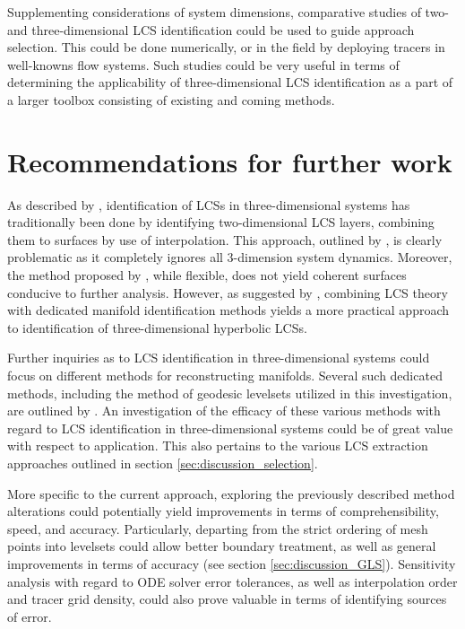 Supplementing considerations of system dimensions, comparative studies of two- and three-dimensional LCS identification could be used to guide approach selection. This could be done numerically, or in the field by deploying tracers in well-knowns flow systems. Such studies could be very useful in terms of determining the applicability of three-dimensional LCS identification as a part of a larger toolbox consisting of existing and coming methods.


\section{Recommendations for further work}

As described by \cite{Oettinger}, identification of LCSs in three-dimensional systems has traditionally been done by identifying two-dimensional LCS layers, combining them to surfaces by use of interpolation. This approach, outlined by \cite{Blazevski}, is clearly problematic as it completely ignores all $3$-dimension system dynamics. Moreover, the method proposed by \cite{Oettinger}, while flexible, does not yield coherent surfaces conducive to further analysis. However, as suggested by \cite{Oettinger}, combining LCS theory with dedicated manifold identification methods yields a more practical approach to identification of three-dimensional hyperbolic LCSs.

Further inquiries as to LCS identification in three-dimensional systems could focus on different methods for reconstructing manifolds. Several such dedicated methods, including the method of geodesic levelsets utilized in this investigation, are outlined by \cite{Survey}. An investigation of the efficacy of these various methods with regard to LCS identification in three-dimensional systems could be of great value with respect to application. This also pertains to the various LCS extraction approaches outlined in section \ref{sec:discussion_selection}.

More specific to the current approach, exploring the previously described method alterations could potentially yield improvements in terms of comprehensibility, speed, and accuracy. Particularly, departing from the strict ordering of mesh points into levelsets could allow better boundary treatment, as well as general improvements in terms of accuracy (see section \ref{sec:discussion_GLS}). Sensitivity analysis with regard to ODE solver error tolerances, as well as interpolation order and tracer grid density, could also prove valuable in terms of identifying sources of error.

